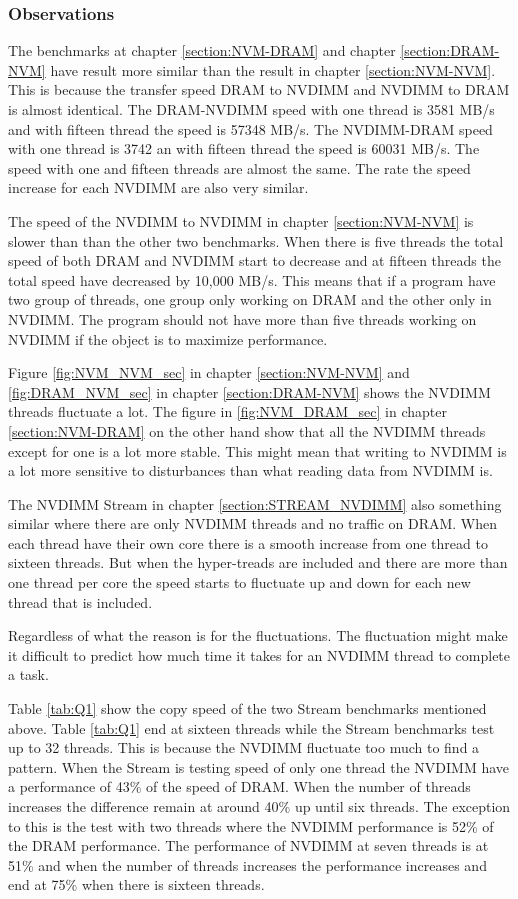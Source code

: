 \documentclass[12pt,a4paper,USenglish]{article}      %
\begin{document}
\subsubsection{Observations}
\label{section:Observations}
The benchmarks at chapter \ref{section:NVM-DRAM} and chapter \ref{section:DRAM-NVM} have result more similar than the result in chapter \ref{section:NVM-NVM}. This is because the transfer speed DRAM to NVDIMM and NVDIMM to DRAM is almost identical. The DRAM-NVDIMM speed with one thread is 3581 MB/s and with fifteen thread the speed is 57348 MB/s. The NVDIMM-DRAM speed with one thread is 3742 an with fifteen thread the speed is 60031 MB/s. The speed with one and fifteen threads are almost the same. The rate the speed increase for each NVDIMM are also very similar.

The speed of the NVDIMM to NVDIMM in chapter \ref{section:NVM-NVM} is slower than than the other two benchmarks. When there is five threads the total speed of both DRAM and NVDIMM start to decrease and at fifteen threads the total speed have decreased by 10,000 MB/s. 
This means that if a program have two group of threads, one group only working on DRAM and the other only in NVDIMM. The program should not have more than five threads working on NVDIMM if the object is to maximize performance.

Figure \ref{fig:NVM_NVM_sec} in chapter \ref{section:NVM-NVM} and \ref{fig:DRAM_NVM_sec} in chapter \ref{section:DRAM-NVM} shows the NVDIMM threads fluctuate a lot. The figure in \ref{fig:NVM_DRAM_sec} in chapter \ref{section:NVM-DRAM} on the other hand show that all the NVDIMM threads except for one is a lot more stable. This might mean that writing to NVDIMM is a lot more sensitive to disturbances than what reading data from NVDIMM is.

The NVDIMM Stream in chapter \ref{section:STREAM_NVDIMM} also something similar where there are only NVDIMM threads and no traffic on DRAM. When each thread have their own core there is a smooth increase from one thread to sixteen threads. But when the hyper-treads are included and there are more than one thread per core the speed starts to fluctuate up and down for each new thread that is included.

Regardless of what the reason is for the fluctuations. The fluctuation might make it difficult to predict how much time it takes for an NVDIMM thread to complete a task.

Table \ref{tab:Q1} show the copy speed of the two Stream benchmarks mentioned above. Table \ref{tab:Q1} end at sixteen threads while the Stream benchmarks test up to 32 threads. This is because the NVDIMM fluctuate too much to find a pattern. When the Stream is testing speed of only one thread the NVDIMM have a performance of 43\% of the speed of DRAM. When the number of threads increases the difference remain at around 40\% up until six threads. The exception to this is the test with two threads where the NVDIMM performance is 52\% of the DRAM performance.
The performance of NVDIMM at seven threads is at 51\% and when the number of threads increases the performance increases and end at 75\% when there is sixteen threads.
\end{document}
